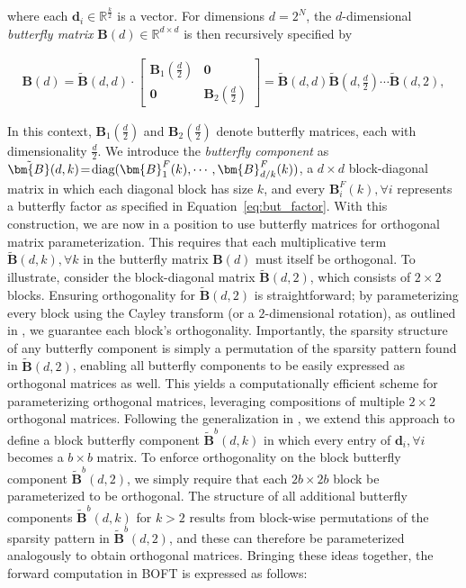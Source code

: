 where each $\bm{d}_i\in\mathbb{R}^{\frac{k}{2}}$ is a vector. For dimensions $d=2^N$, the $d$-dimensional \emph{butterfly matrix} $\bm{B}(d)\in\mathbb{R}^{d\times d}$ is then recursively specified by

\begin{equation}
\begin{aligned}
    \!\!\bm{B}(d)=\tilde{\bm{B}}(d,d)\!\cdot\!\begin{bmatrix}
    \bm{B}_1(\frac{d}{2})\!\!\!\!\! & \bm{0} \\
    \bm{0}\!\!\!\!\! &\bm{B}_2(\frac{d}{2})
    \end{bmatrix}= \tilde{\bm{B}}(d,d)\tilde{\bm{B}}(d,\frac{d}{2})\cdots\tilde{\bm{B}}(d,2),
\end{aligned}
\end{equation}

In this context, $\bm{B}_1(\frac{d}{2})$ and $\bm{B}_2(\frac{d}{2})$ denote butterfly matrices, each with dimensionality $\frac{d}{2}$. We introduce the \emph{butterfly component} as $\thickmuskip=2mu \medmuskip=2mu \tilde{\bm{B}}(d,k)=\text{diag}(\bm{B}^F_1(k),\cdots,\bm{B}^F_{d/k}(k))$, a $d\times d$ block-diagonal matrix in which each diagonal block has size $k$, and every $\bm{B}^F_i(k),\forall i$ represents a butterfly factor as specified in Equation~\ref{eq:but_factor}. With this construction, we are now in a position to use butterfly matrices for orthogonal matrix parameterization. This requires that each multiplicative term $\tilde{\bm{B}}(d,k),\forall k$ in the butterfly matrix $\bm{B}(d)$ must itself be orthogonal. To illustrate, consider the block-diagonal matrix $\tilde{\bm{B}}(d,2)$, which consists of $2\times 2$ blocks. Ensuring orthogonality for $\tilde{\bm{B}}(d,2)$ is straightforward; by parameterizing every block using the Cayley transform (or a $2$-dimensional rotation), as outlined in \cite{liu2021orthogonal,qiu2023controlling}, we guarantee each block’s orthogonality. Importantly, the sparsity structure of any butterfly component is simply a permutation of the sparsity pattern found in $\tilde{\bm{B}}(d,2)$, enabling all butterfly components to be easily expressed as orthogonal matrices as well. This yields a computationally efficient scheme for parameterizing orthogonal matrices, leveraging compositions of multiple $2\times 2$ orthogonal matrices. Following the generalization in \cite{chen2022pixelated}, we extend this approach to define a block butterfly component $\tilde{\bm{B}}^b(d,k)$ in which every entry of $\bm{d}_i,\forall i$ becomes a $b\times b$ matrix. To enforce orthogonality on the block butterfly component $\tilde{\bm{B}}^b(d,2)$, we simply require that each $2b\times 2b$ block be parameterized to be orthogonal. The structure of all additional butterfly components $\tilde{\bm{B}}^b(d,k)$ for $k>2$ results from block-wise permutations of the sparsity pattern in $\tilde{\bm{B}}^b(d,2)$, and these can therefore be parameterized analogously to obtain orthogonal matrices. Bringing these ideas together, the forward computation in BOFT is expressed as follows:

